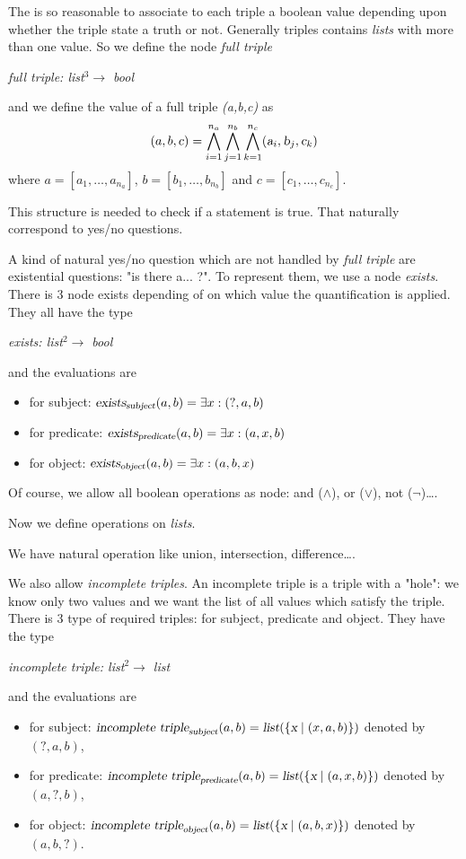 The is so reasonable to associate to each triple a boolean value depending upon whether the triple state a truth or not. Generally triples contains \textsl{lists} with more than one value. So we define the node \textsl{full triple} 
\begin{center}
\textsl{full triple: list$^3\rightarrow$ bool}
\end{center}
and we define the value of a full triple \textsl{(a,b,c)} as $$(a,b,c)=\bigwedge_{i=1}^{n_a}\bigwedge_{j=1}^{n_b}\bigwedge_{k=1}^{n_c} (\textsl{a}_i,\textsl{b}_j,\textsl{c}_k)$$where $a=[a_1,\ldots,a_{n_a}]$, $b=[b_1,\ldots,b_{n_b}]$ and $c=[c_1,\ldots,c_{n_c}]$.

This structure is needed to check if a statement is true. That naturally correspond to yes/no questions.

A kind of natural yes/no question which are not handled by \textsl{full triple} are existential questions: "is there a... ?". To represent them, we use a node \textsl{exists}. There is 3 node exists depending of on which value the quantification is applied. They all have the type
\begin{center}
\textsl{exists: list$^2\rightarrow$ bool}
\end{center}
and the evaluations are
\begin{itemize}
    \item for subject: $\textsl{exists}_{\textsl{subject}}(a,b) = \exists x : (?,a,b)$
    \item for predicate: $\textsl{exists}_{\textsl{predicate}}(a,b) = \exists x : (a,x,b)$
    \item for object: $\textsl{exists}_{\textsl{object}}(a,b) = \exists x : (a,b,x)$
\end{itemize} 

Of course, we allow all boolean operations as node: and ($\wedge$), or ($\vee$), not ($\neg$)\dots.

\bigskip

Now we define operations on \textsl{lists}.

We have natural operation like union, intersection, difference\ldots.

We also allow \textsl{incomplete triples}. An incomplete triple is a triple with a "hole": we know only two values and we want the list of all values which satisfy the triple. There is 3 type of required triples: for subject, predicate and object. They have the type
\begin{center}
\textsl{incomplete triple: list$^2\rightarrow$ list}
\end{center}
and the evaluations are
\begin{itemize}
    \item for subject: $\textsl{incomplete triple}_{\textsl{subject}}(a,b) = \textsl{list}(\{\textsl{x}\mid(x,a,b)\})$ denoted by $(?,a,b)$,
    \item for predicate: $\textsl{incomplete triple}_{\textsl{predicate}}(a,b) = \textsl{list}(\{\textsl{x}\mid(a,x,b)\})$ denoted by $(a,?,b)$,
    \item for object: $\textsl{incomplete triple}_{\textsl{object}}(a,b) = \textsl{list}(\{\textsl{x}\mid(a,b,x)\})$ denoted by $(a,b,?)$.
\end{itemize}

